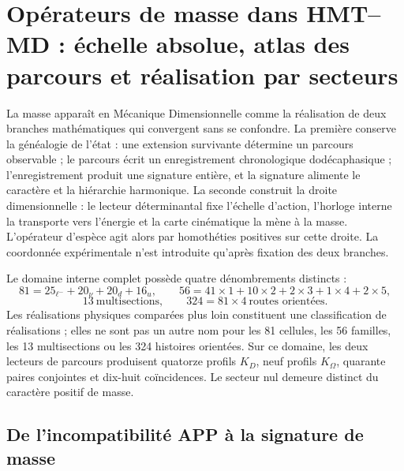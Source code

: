 \section{Opérateurs de masse dans HMT--MD : échelle absolue, atlas des parcours et réalisation par secteurs}
\label{sec:tabla-completa-masas-hmt-sm-revfinal}

La masse apparaît en Mécanique Dimensionnelle comme la réalisation de deux branches
mathématiques qui convergent sans se confondre. La première conserve la généalogie de
l'état : une extension survivante détermine un parcours observable ; le parcours écrit
un enregistrement chronologique dodécaphasique ; l'enregistrement produit une signature entière, et la signature
alimente le caractère et la hiérarchie harmonique. La seconde construit la droite
dimensionnelle : le lecteur déterminantal fixe l'échelle d'action, l'horloge interne la
transporte vers l'énergie et la carte cinématique la mène à la masse. L'opérateur d'espèce
agit alors par homothéties positives sur cette droite. La coordonnée expérimentale
n'est introduite qu'après fixation des deux branches.

Le domaine interne complet possède quatre dénombrements distincts :
\begin{equation}
 81=25_{\ell^-}+20_{\nu}+20_d+16_u,\qquad
 56=41\!\times\!1+10\!\times\!2+2\!\times\!3+1\!\times\!4+2\!\times\!5,
 \label{eq:censos-81-56-masas-rectoras}
\end{equation}
\begin{equation}
 13\ \text{multisections},\qquad
 324=81\times4\ \text{routes orientées}.
 \label{eq:censos-13-324-masas-rectoras}
\end{equation}
Les réalisations physiques comparées plus loin constituent une
classification de réalisations ; elles ne sont pas un autre nom pour les 81 cellules, les 56
familles, les 13 multisections ou les 324 histoires orientées. Sur ce domaine,
les deux lecteurs de parcours produisent quatorze profils \(K_D\), neuf profils
\(K_\Omega\), quarante paires conjointes et dix-huit coïncidences. Le secteur nul
demeure distinct du caractère positif de masse.

\subsection{De l'incompatibilité APP à la signature de masse}

